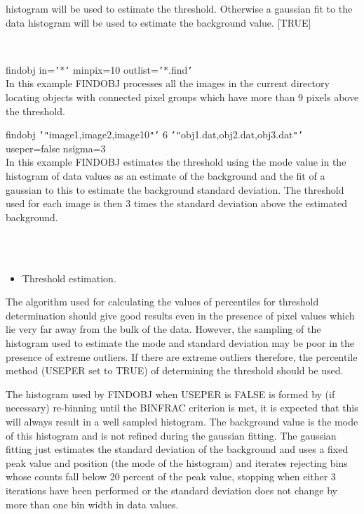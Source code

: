 \documentclass[twoside,11pt]{article}
\renewcommand{\_}{\texttt{\symbol{95}}}
\newcommand{\qt}[1]{{\tt "}#1{\tt "}}
\newcommand{\qs}[1]{{\tt '}#1{\tt '}}
\newcommand{\routine}[1]{{\sc #1}}
\newcommand{\sstexamples}[1]{
   \item[Examples:] \mbox{} \\
   \vspace{-3.5ex}
   \begin{description}
      #1
   \end{description}
}
\newcommand{\sstexamplesubsection}[2]{\sloppy \item{\ssttt #1} \mbox{} \\ #2 }
\newcommand{\sstnotes}[1]{\item[Notes:] \mbox{} \\[1.3ex] #1}
\newcommand{\sstitemlist}[1]{
  \mbox{} \\
  \vspace{-3.5ex}
  \begin{itemize}
     #1
  \end{itemize}
}
\newcommand{\sstitem}{\item}
\newcommand{\sstexamples}[1]{
      \item[Examples:] \\
      \begin{description}
         #1
      \end{description}
      \\
   }
\newcommand{\sstexamplesubsection}[2]{\item[{\ssttt #1}] #2}
\newcommand{\sstnotes}[1]{\item[Notes:] #1 }
\newcommand{\sstitemlist}[1]{
      \begin{itemize}
         #1
      \end{itemize}
      \\
   }
\newcommand{\sstitem}{\item}
\begin{document}
{{{         histogram will be used to estimate the threshold. Otherwise a
         gaussian fit to the data histogram will be used to estimate the
         background value.
         [TRUE]
      }
   }
   \sstexamples{
      \sstexamplesubsection{
         findobj in=\qs{$*$} minpix=10 outlist=\qs{$*$.find}
      } {
         In this example \routine{FINDOBJ} processes all the images in the current
         directory locating objects with connected pixel groups which
         have more than 9 pixels above the threshold.
      }
      \sstexamplesubsection{
         findobj \qs{\qt{image1,image2,image10}} 6
                 \qs{\qt{obj1.dat,obj2.dat,obj3.dat}}
                 useper=false nsigma=3
      } {
         In this example \routine{FINDOBJ} estimates the threshold using the mode
         value in the histogram of data values as an estimate of the
         background and the fit of a gaussian to this to estimate the
         background standard deviation. The threshold used for each image
         is then 3 times the standard deviation above the estimated
         background.
      }
   }
   \sstnotes{
      \sstitemlist{

         \sstitem
         Threshold estimation.

      }
        The algorithm used for calculating the values of percentiles
        for threshold determination should give good results even in the
        presence of pixel values which lie very far away from the bulk
        of the data.  However, the sampling of the histogram used to
        estimate the mode and standard deviation may be poor in the
        presence of extreme outliers.  If there are extreme outliers
        therefore, the percentile method (USEPER set to TRUE) of
        determining the threshold should be used.

        The histogram used by \routine{FINDOBJ} when USEPER is FALSE is formed by
        (if necessary) re-binning until the BINFRAC criterion is met,
        it is expected that this will always result in a well sampled
        histogram. The background value is the mode of this histogram
        and is not refined during the gaussian fitting. The gaussian
        fitting just estimates the standard deviation of the background
        and uses a fixed peak value and position (the mode of the
        histogram) and iterates rejecting bins whose counts fall below
        20 percent of the peak value, stopping when either 3 iterations
        have been performed or the standard deviation does not change
        by more than one bin width in data values.

}}
\end{document}
